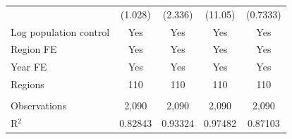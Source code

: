 \begin{tabular}{lcccc}
                          & (1.028)  & (2.336)      & (11.05)       & (0.7333)\\   
   Log population control & Yes      & Yes          & Yes           & Yes\\  
   Region FE              & Yes      & Yes          & Yes           & Yes\\  
   Year FE                & Yes      & Yes          & Yes           & Yes\\  
   Regions                & 110      & 110          & 110           & 110\\  
    \\
   Observations           & 2,090    & 2,090        & 2,090         & 2,090\\  
   R$^2$                  & 0.82843  & 0.93324      & 0.97482       & 0.87103\\  
   \bottomrule
\end{tabular}
\par\endgroup
